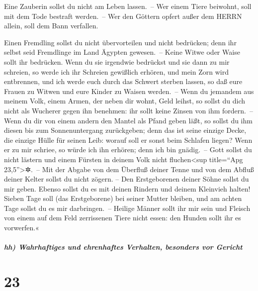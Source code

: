  Eine Zauberin sollst du nicht am Leben lassen.~--
 Wer einem Tiere beiwohnt, soll mit dem Tode bestraft
werden.~--  Wer den Göttern opfert außer dem HERRN
allein, soll dem Bann verfallen.

 Einen Fremdling sollst du nicht übervorteilen und nicht
bedrücken; denn ihr selbst seid Fremdlinge im Land Ägypten gewesen.~--
 Keine Witwe oder Waise sollt ihr bedrücken.
 Wenn du sie irgendwie bedrückst und sie dann zu mir
schreien, so werde ich ihr Schreien gewißlich erhören, 
und mein Zorn wird entbrennen, und ich werde euch durch das Schwert
sterben lassen, so daß eure Frauen zu Witwen und eure Kinder zu Waisen
werden.~--  Wenn du jemandem aus meinem Volk, einem
Armen, der neben dir wohnt, Geld leihst, so sollst du dich nicht als
Wucherer gegen ihn benehmen: ihr sollt keine Zinsen von ihm fordern.~--
 Wenn du dir von einem andern den Mantel als Pfand geben
läßt, so sollst du ihm diesen bis zum Sonnenuntergang zurückgeben;
 denn das ist seine einzige Decke, die einzige Hülle für
seinen Leib: worauf soll er sonst beim Schlafen liegen? Wenn er zu mir
schriee, so würde ich ihn erhören; denn ich bin gnädig.~--
 Gott sollst du nicht lästern und einem Fürsten in deinem
Volk nicht fluchen\textless sup title=``Apg 23,5''\textgreater✲.~--
 Mit der Abgabe von dem Überfluß deiner Tenne und von dem
Abfluß deiner Kelter sollst du nicht zögern. -- Den Erstgeborenen deiner
Söhne sollst du mir geben.  Ebenso sollst du es mit
deinen Rindern und deinem Kleinvieh halten! Sieben Tage soll (das
Erstgeborene) bei seiner Mutter bleiben, und am achten Tage sollst du es
mir darbringen.~--  Heilige Männer sollt ihr mir sein und
Fleisch von einem auf dem Feld zerrissenen Tiere nicht essen: den Hunden
sollt ihr es vorwerfen.«

\hypertarget{hh-wahrhaftiges-und-ehrenhaftes-verhalten-besonders-vor-gericht}{%
\subparagraph{hh) Wahrhaftiges und ehrenhaftes Verhalten, besonders vor
Gericht}\label{hh-wahrhaftiges-und-ehrenhaftes-verhalten-besonders-vor-gericht}}

\hypertarget{section-22}{%
\section{23}\label{section-22}}


